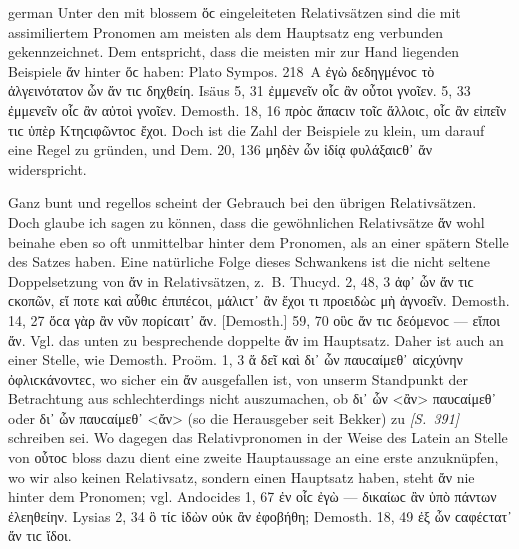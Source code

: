 \begin{otherlanguage*}{german}
Unter den mit blossem ὅϲ eingeleiteten Relativsätzen sind die mit assimiliertem Pronomen am meisten als dem Hauptsatz eng verbunden gekennzeichnet. Dem entspricht, dass die meisten mir zur Hand liegenden Beispiele ἄν hinter ὅϲ haben: Plato Sympos. 218~A ἐγὼ δεδηγμένοϲ τὸ ἀλγεινότατον ὧν ἄν τιϲ δηχθείη. Isäus 5, 31 ἐμμενεῖν οἷϲ ἂν οὗτοι γνοῖεν. 5, 33 ἐμμενεῖν οἷϲ ἂν αὐτοὶ γνοῖεν. Demosth. 18, 16 πρὸϲ ἅπαϲιν τοῖϲ ἄλλοιϲ, οἷϲ ἂν εἰπεῖν τιϲ ὑπὲρ Κτηϲιφῶντοϲ ἔχοι. Doch ist die Zahl der Beispiele zu klein, um darauf eine Regel zu gründen, und Dem. 20, 136 μηδὲν ὧν ἰδίᾳ φυλάξαιϲθ᾽ ἄν widerspricht.

Ganz bunt und regellos scheint der Gebrauch bei den übrigen Relativsätzen. Doch glaube ich sagen zu können, dass die gewöhnlichen Relativsätze ἄν wohl beinahe eben so oft unmittelbar hinter dem Pronomen, als an einer spätern Stelle des Satzes haben. Eine natürliche Folge dieses Schwankens ist die nicht seltene Doppelsetzung von ἄν in Relativsätzen, z.~B. Thucyd. 2, 48, 3 ἀφ᾽ ὧν ἄν τιϲ ϲκοπῶν, εἴ ποτε καὶ αὖθιϲ ἐπιπέϲοι, μάλιϲτ᾽ ἂν ἔχοι τι προειδὼϲ μὴ ἀγνοεῖν. Demosth. 14, 27 ὅϲα γὰρ ἂν νῦν πορίϲαιτ᾽ ἄν. [Demosth.] 59, 70 οὓϲ ἄν τιϲ δεόμενοϲ — εἴποι ἄν. Vgl. das unten zu besprechende doppelte ἄν im Hauptsatz. Daher ist auch an einer Stelle, wie Demosth. Proöm. 1, 3 ἅ δεῖ καὶ δι᾽ ὧν παυϲαίμεθ᾽ αἰϲχύνην ὀφλιϲκάνοντεϲ, wo sicher ein ἄν ausgefallen ist, von unserm Standpunkt der Betrachtung aus schlechterdings nicht auszumachen, ob δι᾽ ὧν <ἂν> παυϲαίμεθ᾽ oder δι᾽ ὧν παυϲαίμεθ᾽ <ἄν> (so die Herausgeber seit Bekker) zu \hypertarget{p391}{\emph{[S.~391]}}\label{p391} schreiben sei. Wo dagegen das Relativpronomen in der Weise des Latein an Stelle von οὗτοϲ bloss dazu dient eine zweite Hauptaussage an eine erste anzuknüpfen, wo wir also keinen Relativsatz, sondern einen Hauptsatz haben, steht ἄν nie hinter dem Pronomen; vgl. Andocides 1, 67 ἐν οἷϲ ἐγὼ — δικαίωϲ ἂν ὑπὸ πάντων ἐλεηθείην. Lysias 2, 34 ὃ τίϲ ἰδὼν οὐκ ἂν ἐφοβήθη; Demosth. 18, 49 ἐξ ὧν ϲαφέϲτατ᾽ ἄν τιϲ ἴδοι.


\end{otherlanguage*}
